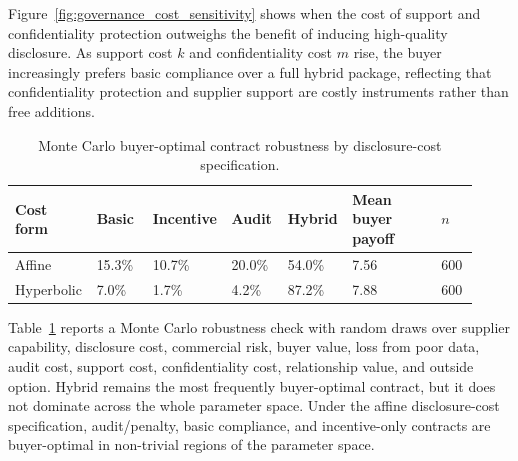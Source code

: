 \documentclass[final,5p,times,authoryear]{elsarticle}
\begin{document}
Figure~\ref{fig:governance_cost_sensitivity} shows when the cost of support and confidentiality protection outweighs the benefit of inducing high-quality disclosure. As support cost $k$ and confidentiality cost $m$ rise, the buyer increasingly prefers basic compliance over a full hybrid package, reflecting that confidentiality protection and supplier support are costly instruments rather than free additions.

\FloatBarrier

\begin{table}[t]
\centering
\begingroup
\setlength{\tabcolsep}{3pt}
\small
\caption{Monte Carlo buyer-optimal contract robustness by disclosure-cost specification.}
\label{tab:monte_carlo_buyer_choice}
\begin{tabular}{@{}p{0.16\linewidth}p{0.12\linewidth}p{0.13\linewidth}p{0.12\linewidth}p{0.12\linewidth}p{0.19\linewidth}p{0.08\linewidth}@{}}
\toprule
Cost form & Basic & Incentive & Audit & Hybrid & Mean buyer payoff & $n$ \\
\midrule
Affine & 15.3\% & 10.7\% & 20.0\% & 54.0\% & 7.56 & 600 \\
Hyperbolic & 7.0\% & 1.7\% & 4.2\% & 87.2\% & 7.88 & 600 \\
\bottomrule
\end{tabular}
\endgroup
\end{table}
\FloatBarrier

Table~\ref{tab:monte_carlo_buyer_choice} reports a Monte Carlo robustness check with random draws over supplier capability, disclosure cost, commercial risk, buyer value, loss from poor data, audit cost, support cost, confidentiality cost, relationship value, and outside option. Hybrid remains the most frequently buyer-optimal contract, but it does not dominate across the whole parameter space. Under the affine disclosure-cost specification, audit/penalty, basic compliance, and incentive-only contracts are buyer-optimal in non-trivial regions of the parameter space.
\end{document}
